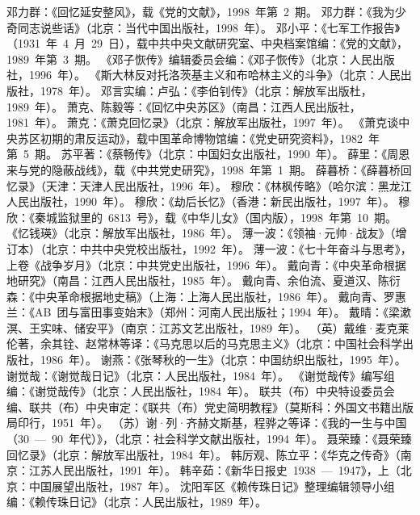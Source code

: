 \begin{thebibliography}{999}
\bibitem{}邓力群：《回忆延安整风》，载《党的文献》，1998~年第~2~期。
\bibitem{}邓力群：《我为少奇同志说些话》（北京：当代中国出版社，1998~年）。
\bibitem{}邓小平：《七军工作报告》（1931~年~4~月~29~日），载中共中央文献研究室、中央档案馆编：《党的文献》，1989~年第~3~期。
\bibitem{}《邓子恢传》编辑委员会编：《邓子恢传》（北京：人民出版社，1996~年）。
\bibitem{}《斯大林反对托洛茨基主义和布哈林主义的斗争》（北京：人民出版社，1978~年）。
\bibitem{}邓言实编：卢弘：《李伯钊传》（北京：解放军出版杜，1989~年）。
\bibitem{}萧克、陈毅等：《回忆中央苏区》（南昌：江西人民出版社，1981~年）。
\bibitem{}萧克：《萧克回忆录》（北京：解放军出版社，1997~年）。
\bibitem{}《萧克谈中央苏区初期的肃反运动》，载中国革命博物馆编：《党史研究资料》，1982~年第~5~期。
\bibitem{}苏平著：《蔡畅传》（北京：中国妇女出版社，1990~年）。
\bibitem{}薛里：《周恩来与党的隐蔽战线》，载《中共党史研究》，1998~年第~1~期。
\bibitem{}薛暮桥：《薛暮桥回忆录》（天津：天津人民出版社，1996~年）。
\bibitem{}穆欣：《林枫传略》（哈尔滨：黑龙江人民出版社，1990~年）。
\bibitem{}穆欣：《劫后长忆》（香港：新民出版社，1997~年）。
\bibitem{}穆欣：《秦城监狱里的~6813~号》，载《中华儿女》（国内版），1998~年第~10~期。
\bibitem{}《忆钱瑛》（北京：解放军出版社，1986~年）。
\bibitem{}薄一波：《领袖·元帅·战友》（增订本）（北京：中共中央党校出版社，1992~年）。
\bibitem{}薄一波：《七十年奋斗与思考》，上卷《战争岁月》（北京：中共党史出版社，1996~年）。
\bibitem{}戴向青：《中央革命根据地研究》（南昌：江西人民出版社，1985~年）。
\bibitem{}戴向青、余伯流、夏道汉、陈衍森：《中央革命根据地史稿》（上海：上海人民出版社，1986~年）。
\bibitem{}戴向青、罗惠兰：《AB~团与富田事变始末》（郑州：河南人民出版社；1994~年）。
\bibitem{}戴晴：《梁漱溟、王实味、储安平》（南京：江苏文艺出版社，1989~年）。
\bibitem{}（英）戴维·麦克莱伦著，余其铨、赵常林等译：《马克思以后的马克思主义》（北京：中国社会科学出版社，1986~年）。
\bibitem{}谢燕：《张琴秋的一生》（北京：中国纺织出版社，1995~年）。
\bibitem{}谢觉哉：《谢觉哉日记》（北京：人民出版社，1984~年）。
\bibitem{}《谢觉哉传》编写组编：《谢觉哉传》（北京：人民出版社，1984~年）。
\bibitem{}联共（布）中央特设委员会编、联共（布）中央审定：《联共（布）党史简明教程》（莫斯科：外国文书籍出版局印行，1951~年）。
\bibitem{}（苏）谢·列·齐赫文斯基，程骅之等译：《我的一生与中国（30~—~90~年代）》，（北京：社会科学文献出版社，1994~年）。
\bibitem{}聂荣臻：《聂荣臻回忆录》（北京：解放军出版社，1984~年）。
\bibitem{}韩厉观、陈立平：《华克之传奇》（南京：江苏人民出版社，1991~年）。
\bibitem{}韩辛茹：《新华日报史~1938~—~1947》，上（北京：中国展望出版社，1987~年）。
\bibitem{}沈阳军区《赖传珠日记》整理编辑领导小组编：《赖传珠日记》（北京：人民出版社，1989~年）。

\end{thebibliography}
